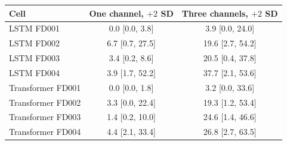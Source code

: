 \begin{tabular}{lcc}\toprule
Cell & One channel, $+2$ SD & Three channels, $+2$ SD \\ \midrule
LSTM FD001 & 0.0 [0.0, 3.8] & 3.9 [0.0, 24.0] \\
LSTM FD002 & 6.7 [0.7, 27.5] & 19.6 [2.7, 54.2] \\
LSTM FD003 & 3.4 [0.2, 8.6] & 20.5 [0.4, 37.8] \\
LSTM FD004 & 3.9 [1.7, 52.2] & 37.7 [2.1, 53.6] \\
Transformer FD001 & 0.0 [0.0, 1.8] & 3.2 [0.0, 33.6] \\
Transformer FD002 & 3.3 [0.0, 22.4] & 19.3 [1.2, 53.4] \\
Transformer FD003 & 1.4 [0.2, 10.0] & 24.6 [1.4, 46.6] \\
Transformer FD004 & 4.4 [2.1, 33.4] & 26.8 [2.7, 63.5] \\
\bottomrule\end{tabular}
